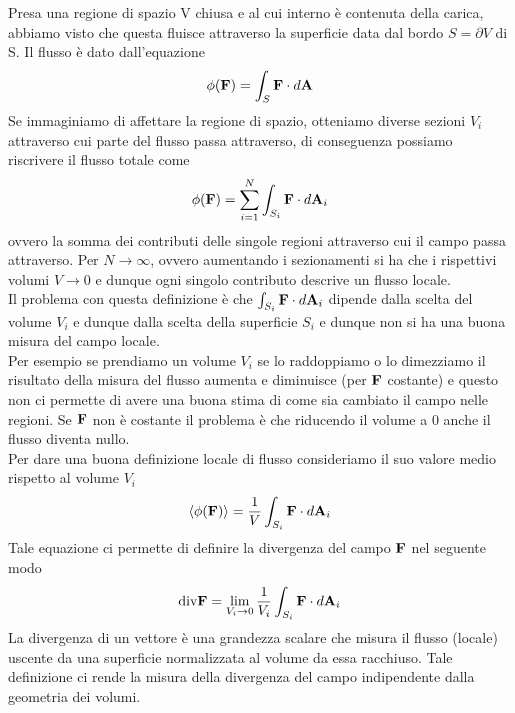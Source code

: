 \noindent Presa una regione di spazio V chiusa e al cui interno \`e contenuta della carica, abbiamo visto che questa fluisce attraverso la superficie data dal bordo $S = \partial V$ di S. Il flusso \`e dato dall'equazione
\begin{equation*}
	\phi(\bold{F}) = \int_{S} \bold{F} \cdot d\bold{A}
\end{equation*} 
Se immaginiamo di affettare la regione di spazio, otteniamo diverse sezioni $V_i$ attraverso cui parte del flusso passa attraverso, di conseguenza possiamo riscrivere il flusso totale come
\begin{equation*}
	\phi(\bold{F}) = \sum_{i=1}^N \int_{ S_i} \bold{F} \cdot d\bold{A}_i
\end{equation*}
ovvero la somma dei contributi delle singole regioni attraverso cui il campo passa attraverso. Per $N \to \infty$, ovvero aumentando i sezionamenti si ha che i rispettivi volumi $V \to 0$ e dunque ogni singolo contributo descrive un flusso locale.
\\

\noindent Il problema con questa definizione \`e che $\int_{S_i} \bold{F} \cdot d\bold{A}_i$ dipende dalla scelta del volume $V_i$ e dunque dalla scelta della superficie $S_i$ e dunque non si ha una buona misura del campo locale.
\\
Per esempio se prendiamo un volume $V_i$ se lo raddoppiamo o lo dimezziamo il risultato della misura del flusso aumenta e diminuisce (per $\bold{F}$ costante) e questo non ci permette di avere una buona stima di come sia cambiato il campo nelle regioni. Se $\bold{F}$ non \`e costante il problema \`e che riducendo il volume a 0 anche il flusso diventa nullo.
\\

Per dare una buona definizione locale di flusso consideriamo il suo valore medio rispetto al volume $V_i$
\begin{equation*}
	\langle \phi(\bold{F}) \rangle = \frac{1}{V}\int_{S_i} \bold{F} \cdot d \bold{A}_i
\end{equation*}
Tale equazione ci permette di definire la divergenza del campo $\bold{F}$ nel seguente modo
\begin{equation}
	\text{div}\bold{F} = \lim_{V_i \to 0} \frac{1}{V_i} \int_{S_i} \bold{F} \cdot d\bold{A}_i
\end{equation}
La divergenza di un vettore \`e una grandezza scalare che misura il flusso (locale) uscente da una superficie normalizzata al volume da essa racchiuso. Tale definizione ci rende la misura della divergenza del campo indipendente dalla geometria dei volumi.
\\

